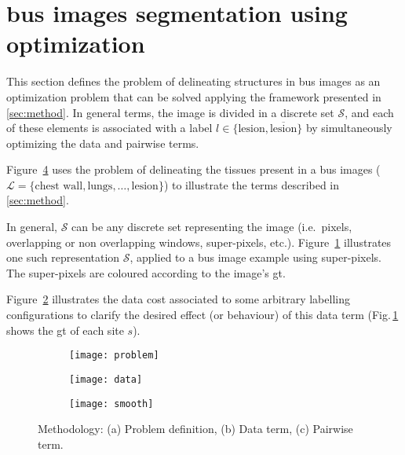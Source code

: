 \section{\ac{bus} images segmentation using optimization}\label{sec:methodApp}
This section defines the problem of delineating structures in \ac{bus} images as an optimization problem that can be solved applying the framework presented in \cref{sec:method}.
In general terms, the image is divided in a discrete set $\mathcal{S}$, and each of these elements is associated with a label $l \in \{\text{lesion}, \overline{\text{lesion}}\}$ by simultaneously optimizing the data and pairwise terms. 

Figure~\ref{fig:methodterms} uses the problem of delineating the tissues present in a \ac{bus} images ($\mathcal{L} = \{ \text{chest wall}, \text{lungs}, \dots, \text{lesion} \}$) to illustrate the terms described in \cref{sec:method}. 

{\color{red}
In general, $\mathcal{S}$ can be any discrete set representing the image (i.e.\, pixels, overlapping or non overlapping windows, super-pixels, etc.). 
Figure~\ref{fig:methodTerms:problem} illustrates one such representation $\mathcal{S}$, applied to a \ac{bus} image example using super-pixels. The super-pixels are coloured according to the image's \ac{gt}.

Figure~\ref{fig:methodTerms:data} illustrates the data cost associated to some arbitrary labelling configurations to clarify the desired effect (or behaviour) of this data term (Fig.\,\ref{fig:methodTerms:problem} shows the \ac{gt} of each site $s$).
}

\begin{figure}
    \centering
    \begin{subfigure}[b]{0.19\textwidth}
        \centering
        \texttt{[image: problem]}
        \label{fig:methodTerms:problem}
    \end{subfigure}
    \hfill
    \begin{subfigure}[b]{0.39\textwidth}  
        \centering 
        \texttt{[image: data]}
        \label{fig:methodTerms:data}
    \end{subfigure}
    \hfill
    \begin{subfigure}[b]{0.39\textwidth}   
        \centering 
        \texttt{[image: smooth]} 
        \label{fig:methodTerms:boundary}
    \end{subfigure}
    \caption {\small Methodology: (a) Problem definition, (b) Data term, (c) Pairwise term.} 
    \label{fig:methodterms}
\end{figure}


